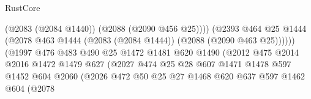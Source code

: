 \begin{lexlean}{RustCore}
\begin{coremodule}
                                                (@2083 (@2084 @1440))
                                                (@2088 (@2090 @456 @25))))
                                            (@2393
                                              @464
                                              @25
                                              @1444
                                              (@2078
                                                @463
                                                @1444
                                                (@2083 (@2084 @1444))
                                                (@2088 (@2090 @463 @25))))))
                                        (@1997
                                          @476
                                          @483
                                          @490
                                          @25
                                          @1472
                                          @1481
                                          @620
                                          @1490
                                          (@2012
                                            @475
                                            @2014
                                            @2016
                                            @1472
                                            @1479
                                            @627
                                            (@2027
                                              @474
                                              @25
                                              @28
                                              @607
                                              @1471
                                              @1478
                                              @597
                                              @1452
                                              @604
                                              @2060
                                              (@2026
                                                @472
                                                @50
                                                @25
                                                @27
                                                @1468
                                                @620
                                                @637
                                                @597
                                                @1462
                                                @604
                                                (@2078

\end{coremodule}
\end{lexlean}
